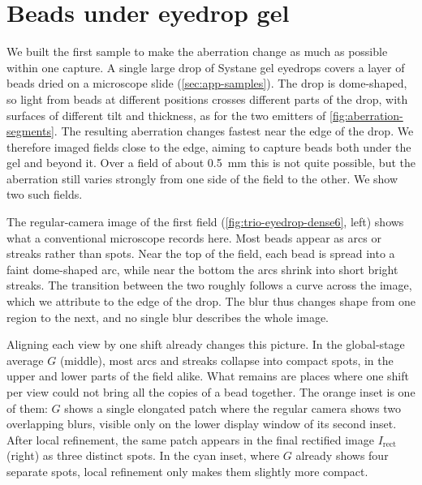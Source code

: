\section{Beads under eyedrop gel}
\label{sec:results-eyedrop}

We built the first sample to make the aberration change as much as possible within one capture. A single large drop of Systane gel eyedrops covers a layer of beads dried on a microscope slide (\cref{sec:app-samples}). The drop is dome-shaped, so light from beads at different positions crosses different parts of the drop, with surfaces of different tilt and thickness, as for the two emitters of \cref{fig:aberration-segments}. The resulting aberration changes fastest near the edge of the drop. We therefore imaged fields close to the edge, aiming to capture beads both under the gel and beyond it. Over a field of about 0.5~mm this is not quite possible, but the aberration still varies strongly from one side of the field to the other. We show two such fields.

The regular-camera image of the first field (\cref{fig:trio-eyedrop-dense6}, left) shows what a conventional microscope records here. Most beads appear as arcs or streaks rather than spots. Near the top of the field, each bead is spread into a faint dome-shaped arc, while near the bottom the arcs shrink into short bright streaks. The transition between the two roughly follows a curve across the image, which we attribute to the edge of the drop. The blur thus changes shape from one region to the next, and no single blur describes the whole image.

Aligning each view by one shift already changes this picture. In the global-stage average $G$ (middle), most arcs and streaks collapse into compact spots, in the upper and lower parts of the field alike. What remains are places where one shift per view could not bring all the copies of a bead together. The orange inset is one of them: $G$ shows a single elongated patch where the regular camera shows two overlapping blurs, visible only on the lower display window of its second inset. After local refinement, the same patch appears in the final rectified image $I_{\mathrm{rect}}$ (right) as three distinct spots. In the cyan inset, where $G$ already shows four separate spots, local refinement only makes them slightly more compact.

